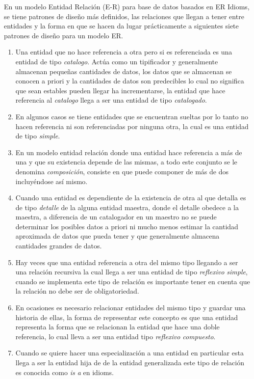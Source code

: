 En un modelo Entidad Relaci\'on (E-R) para base de datos basados en ER Idioms\cite{idioms}, se tiene patrones de dise\~no m\'as definidos, las relaciones que llegan a tener entre entidades y la forma en que se hacen da lugar pr\'acticamente a siguientes siete patrones de dise\~no para un modelo ER.
\begin{enumerate}
\item Una entidad que no hace referencia a otra pero si es referenciada es una entidad de tipo \textit{catalogo}. Act\'ua como un tipificador y generalmente almacenan peque\~nas cantidades de datos, los datos que se almacenan  se conocen a priori y la cantidades de datos son predecibles lo cual no significa que sean estables pueden llegar ha incrementarse, la entidad que hace referencia al \textit{catalogo} llega a ser una entidad de tipo \textit{catalogado}.
\item En algunos casos se tiene entidades que se encuentran sueltas por lo tanto no hacen referencia ni son referenciadas por ninguna otra, la cual es una entidad de tipo \textit{simple}.
\item En un modelo entidad relaci\'on donde una entidad hace referencia a m\'as de una y que su existencia depende de las mismas, a todo este conjunto se le denomina  \textit{composici\'on}, consiste en que puede componer de m\'as de dos incluy\'endose as\'i mismo.
\item
Cuando una entidad es dependiente de la existencia de otra al que detalla es de tipo \textit{detalle} de la alguna entidad maestra, donde el  detalle obedece a la maestra, a diferencia de un catalogador en un maestro no se puede determinar  los posibles datos a priori ni mucho menos estimar la cantidad aproximada de datos que pueda tener y que generalmente almacena cantidades grandes de datos.
\item
Hay veces que una entidad referencia a otra del mismo tipo llegando a ser una relaci\'on recursiva la cual llega a ser una entidad de tipo \textit{reflexivo simple}, cuando se implementa este tipo de relaci\'on es importante tener en cuenta que la relaci\'on no debe ser de obligatoriedad.
\item
En ocasiones es necesario relacionar entidades del mismo tipo y guardar una historia de ellas, la forma de representar este concepto es que una entidad representa la forma que se relacionan la entidad que hace una doble referencia, lo cual lleva a ser una entidad tipo  \textit{reflexivo compuesto}.
\item
Cuando se quiere hacer una especializaci\'on a una entidad en particular esta llega a ser la entidad hija de de la entidad generalizada este tipo de relaci\'on es conocida como \textit{is a} en idioms.
\end{enumerate}

